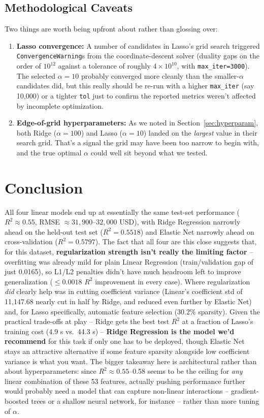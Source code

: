\documentclass[12pt,a4paper]{article}
\begin{document}
\subsection*{Methodological Caveats}
Two things are worth being upfront about rather than glossing over:
\begin{enumerate}
\item \textbf{Lasso convergence:} A number of candidates in Lasso's grid search triggered \texttt{ConvergenceWarning}s from the coordinate-descent solver (duality gaps on the order of $10^{12}$ against a tolerance of roughly $4\times10^{10}$, with \texttt{max\_iter=3000}). The selected $\alpha=10$ probably converged more cleanly than the smaller-$\alpha$ candidates did, but this really should be re-run with a higher \texttt{max\_iter} (say 10{,}000) or a tighter \texttt{tol} just to confirm the reported metrics weren't affected by incomplete optimization.
\item \textbf{Edge-of-grid hyperparameters:} As we noted in Section~\ref{sec:hyperparam}, both Ridge ($\alpha=100$) and Lasso ($\alpha=10$) landed on the \textit{largest} value in their search grid. That's a signal the grid may have been too narrow to begin with, and the true optimal $\alpha$ could well sit beyond what we tested.
\end{enumerate}

\section{Conclusion}\label{sec:conclusion}
All four linear models end up at essentially the same test-set performance ($R^2 \approx 0.55$, RMSE $\approx 31{,}900$--$32{,}000$ USD), with Ridge Regression narrowly ahead on the held-out test set ($R^2=0.5518$) and Elastic Net narrowly ahead on cross-validation ($R^2=0.5797$). The fact that all four are this close suggests that, for this dataset, \textbf{regularization strength isn't really the limiting factor} -- overfitting was already mild for plain Linear Regression (train/validation gap of just 0.0165), so L1/L2 penalties didn't have much headroom left to improve generalization ($\leq 0.0018$ $R^2$ improvement in every case). Where regularization \textit{did} clearly help was in cutting coefficient variance (Linear's coefficient std of 11{,}147.68 nearly cut in half by Ridge, and reduced even further by Elastic Net) and, for Lasso specifically, automatic feature selection (30.2\% sparsity). Given the practical trade-offs at play -- Ridge gets the best test $R^2$ at a fraction of Lasso's training cost (4.9 s vs.\ 44.3 s) -- \textbf{Ridge Regression is the model we'd recommend} for this task if only one has to be deployed, though Elastic Net stays an attractive alternative if some feature sparsity alongside low coefficient variance is what you want. The bigger takeaway here is architectural rather than about hyperparameters: since $R^2 \approx 0.55$--0.58 seems to be the ceiling for \textit{any} linear combination of these 53 features, actually pushing performance further would probably need a model that can capture non-linear interactions -- gradient-boosted trees or a shallow neural network, for instance -- rather than more tuning of $\alpha$.
\end{document}
